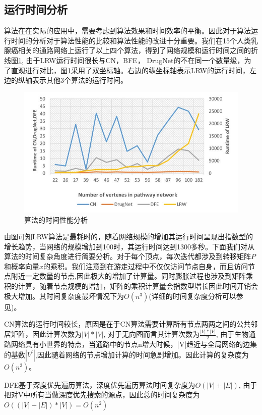 \subsection{运行时间分析}
算法在在实际的应用中，需要考虑到算法效果和时间效率的平衡。因此对于算法运行时间的分析对于算法性能的比较和算法性能的改进十分重要。我们在15个人类乳腺癌相关的通路网络上运行了以上四个算法，得到了网络规模和运行时间之间的折线图\ref{runtime}, 由于LRW运行时间很长与CN，BFE， DrugNet的不在同一个数量级，为了直观进行对比，图\ref{runtime}采用了双坐标轴。右边的纵坐标轴表示LRW的运行时间，左边的纵轴表示其他3个算法的运行时间。
\begin{figure}[h]
\centering
\includegraphics[width = 1.0\textwidth]{runtime}
\caption[runtime]{算法的时间性能分析}
\label{runtime}
\end{figure}

由图可知LRW算法是最耗时的，随着网络规模的增加其运行时间呈现出指数型的增长趋势，当网络的规模增加到100时，其运行时间达到1300多秒。下面我们对从算法的时间复杂角度进行简要分析。对于每个顶点，每次迭代都涉及到转移矩阵$P$和概率向量$x$的乘积。我们注意到在游走过程中不仅仅访问节点自身，而且访问节点附近一定数量的节点,因此极大的增加了计算量。同时膨胀过程也涉及到矩阵乘积的计算，随着节点规模的增加，矩阵的乘积计算量会指数型增长因此时间开销会极大增加。其时间复杂度最坏情况下为$O(n^{3})$(详细的时间复杂度分析可以参见\cite{zhang2016limited})。

CN算法的运行时间较长，原因是在于CN算法需要计算所有节点两两之间的公共邻居矩阵，因此计算次数为$|V|*|V|$, 对于无向图而言其计算次数为$\frac{|V|*|V|}{2}$, 由于生物通路网络具有小世界的特点，当通路中的节点n增大时候，|V|趋近与全局网络的边集的基数$|V^{'}|$,因此随着网络的节点增加计算的时间急剧增加。因此计算的复杂度为$O(n^{2})$。

DFE基于深度优先遍历算法，深度优先遍历算法时间复杂度为$O(|V| + |E|)$, 由于把对V中所有当做深度优先搜索的源点，因此总的时间复杂度为$O((|V| + |E|)*|V|)=O(n^{2})$

